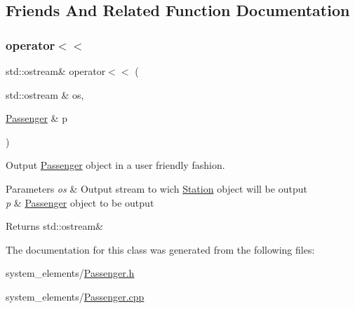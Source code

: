 \subsection{Friends And Related Function Documentation}
\mbox{\label{classPassenger_a7b1aeaded08562578690b788f39db888}} 
\subsubsection{\texorpdfstring{operator$<$$<$}{operator<<}}
{\footnotesize\ttfamily std\+::ostream\& operator$<$$<$ (\begin{DoxyParamCaption}\item[{std\+::ostream \&}]{os,  }\item[{\mbox{\hyperlink{classPassenger}{Passenger}} \&}]{p }\end{DoxyParamCaption})\hspace{0.3cm}{\ttfamily [friend]}}



Output \mbox{\hyperlink{classPassenger}{Passenger}} object in a user friendly fashion. 


\begin{DoxyParams}{Parameters}
{\em os} & Output stream to wich \mbox{\hyperlink{classStation}{Station}} object will be output \\
\hline
{\em p} & \mbox{\hyperlink{classPassenger}{Passenger}} object to be output \\
\hline
\end{DoxyParams}
\begin{DoxyReturn}{Returns}
std\+::ostream\& 
\end{DoxyReturn}


The documentation for this class was generated from the following files\+:\begin{DoxyCompactItemize}
\item 
system\+\_\+elements/\mbox{\hyperlink{Passenger_8h}{Passenger.\+h}}\item 
system\+\_\+elements/\mbox{\hyperlink{Passenger_8cpp}{Passenger.\+cpp}}\end{DoxyCompactItemize}
